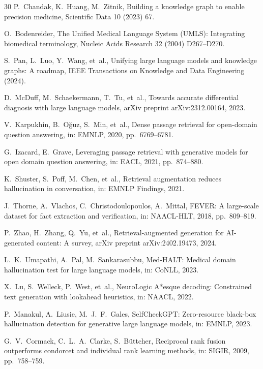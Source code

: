 \documentclass[preprint,12pt]{elsarticle}
\begin{document}
\begin{thebibliography}{30}
P.~Chandak, K.~Huang, M.~Zitnik, Building a knowledge graph to enable precision medicine, Scientific Data 10 (2023) 67.

O.~Bodenreider, The Unified Medical Language System (UMLS): Integrating biomedical terminology, Nucleic Acids Research 32 (2004) D267--D270.

S.~Pan, L.~Luo, Y.~Wang, et~al., Unifying large language models and knowledge graphs: A roadmap, IEEE Transactions on Knowledge and Data Engineering (2024).

D.~McDuff, M.~Schaekermann, T.~Tu, et~al., Towards accurate differential diagnosis with large language models, arXiv preprint arXiv:2312.00164, 2023.

V.~Karpukhin, B.~O\u{g}uz, S.~Min, et~al., Dense passage retrieval for open-domain question answering, in: EMNLP, 2020, pp.~6769--6781.

G.~Izacard, E.~Grave, Leveraging passage retrieval with generative models for open domain question answering, in: EACL, 2021, pp.~874--880.

K.~Shuster, S.~Poff, M.~Chen, et~al., Retrieval augmentation reduces hallucination in conversation, in: EMNLP Findings, 2021.

J.~Thorne, A.~Vlachos, C.~Christodoulopoulos, A.~Mittal, FEVER: A large-scale dataset for fact extraction and verification, in: NAACL-HLT, 2018, pp.~809--819.

P.~Zhao, H.~Zhang, Q.~Yu, et~al., Retrieval-augmented generation for AI-generated content: A survey, arXiv preprint arXiv:2402.19473, 2024.

L.~K.~Umapathi, A.~Pal, M.~Sankarasubbu, Med-HALT: Medical domain hallucination test for large language models, in: CoNLL, 2023.

X.~Lu, S.~Welleck, P.~West, et~al., NeuroLogic A*esque decoding: Constrained text generation with lookahead heuristics, in: NAACL, 2022.

P.~Manakul, A.~Liusie, M.~J.~F.~Gales, SelfCheckGPT: Zero-resource black-box hallucination detection for generative large language models, in: EMNLP, 2023.

G.~V.~Cormack, C.~L.~A.~Clarke, S.~B\"uttcher, Reciprocal rank fusion outperforms condorcet and individual rank learning methods, in: SIGIR, 2009, pp.~758--759.


\end{thebibliography}
\end{document}
